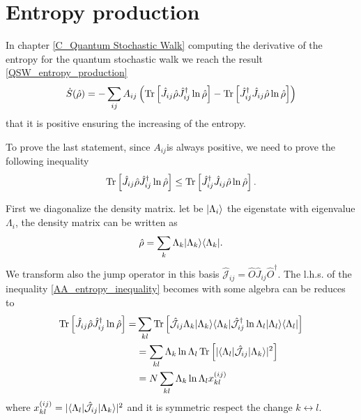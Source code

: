\chapter{Entropy production} \label{A_entropy_increasing}

In chapter \ref{C_Quantum Stochastic Walk} computing the derivative of the entropy for the quantum stochastic walk we reach the result \eqref{QSW_entropy_production}
\begin{equation}
        \dot S(\hat\rho) =  -\sum_{ij}A_{ij}\left(\operatorname{Tr}\left[\hat J_{ij} \hat\rho\hat J_{ij}^\dagger\ln\hat\rho\right]-\operatorname{Tr}\left[\hat J_{ij}^\dagger \hat J_{ij}\hat\rho\ln\hat\rho\right]\right)
\end{equation}
that it is positive ensuring the increasing of the entropy.

To prove the last statement, since $A_{ij}$is always positive, we need to prove the following inequality
\begin{equation}\label{AA_entropy_inequality}
    \operatorname{Tr}\left[\hat J_{ij}\hat\rho\hat J_{ij}^\dagger\ln\hat\rho\right] \leq \operatorname{Tr}\left[\hat J_{ij}^\dagger\hat J_{ij}\hat\rho\ln\hat\rho\right].
\end{equation}

First we diagonalize the density matrix. let be $\lvert\Lambda_i\rangle$ the eigenstate with eigenvalue $\Lambda_i$, the density matrix can be written as
\begin{equation}
    \hat \rho = \sum_k \Lambda_k\lvert\Lambda_k\rangle\langle\Lambda_k\rvert.
\end{equation}
We transform also the jump operator in this basis $\hat{\mathcal{J}}_{ij}= \hat O \hat J_{ij}\hat O^\dagger$.
The l.h.s. of the inequality \eqref{AA_entropy_inequality} becomes with some algebra can be reduces to 
\begin{equation}
    \begin{split}
        \operatorname{Tr}\left[\hat J_{ij} \hat\rho\hat J_{ij}^\dagger\ln\hat\rho\right]=& \sum_{kl}\operatorname{Tr}\left[\hat{\mathcal{J}}_{ij} \Lambda_k\lvert\Lambda_k\rangle\langle\Lambda_k\rvert\hat{\mathcal{J}}_{ij}^\dagger\ln\Lambda_l \lvert\Lambda_l\rangle\langle\Lambda_l\rvert\right] \\
        &= \sum_{kl}\Lambda_k\ln\Lambda_l\operatorname{Tr}\left[|\langle\Lambda_l\rvert\hat{\mathcal{J}}_{ij} \lvert\Lambda_k\rangle|^2\right]\\
        &= N \sum_{kl}\Lambda_k\ln\Lambda_lx^{(ij)}_{kl}
    \end{split}
\end{equation}
where $x^{(ij)}_{kl} = |\langle\Lambda_l\rvert\hat{\mathcal{J}}_{ij} \lvert\Lambda_k\rangle|^2$ and it is symmetric respect the change $k \leftrightarrow l$. 

